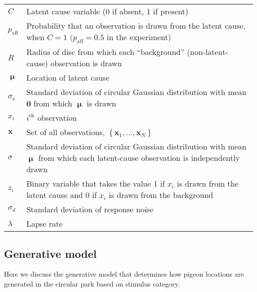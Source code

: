 \documentclass{article}
\newcommand{\mu}{\boldsymbol\upmu}
\newcommand{\sigs}{\sigma_\text{s}}
\newcommand{\xx}{\mathbf{x}}
\begin{document}
\noindent
\begin{tabular}{|l|p{4in}|}
\hline
$C$ & Latent cause variable (0 if absent, 1 if present)\\
$p_{\text{aff}}$ & Probability that an observation is drawn from the latent cause, when $C=1$ $(p_{\text{aff}}=0.5$ in the experiment)\\
$R$ & Radius of disc from which each ``background'' (non-latent-cause) observation is drawn\\
 $\mu$ & Location of latent cause\\
$\sigs$ & Standard deviation of circular Gaussian distribution with mean $\mathbf{0}$ from which $\mu$ is drawn\\
$x_i$ & $i^\text{th}$ observation\\
$\mathbf{x}$ & Set of all observations, $\left\{\xx_1, \dots, \xx_N\right\}$\\
$\sigma$ & Standard deviation of circular Gaussian distribution with mean  $\mu$ from which each latent-cause observation is  independently drawn\\
$z_i$ & Binary variable that takes the value 1 if $x_i$ is drawn from the latent cause and 0 if $x_i$ is drawn from the background\\
$\sigma_d$ & Standard deviation of response noise\\
$\lambda$ & Lapse rate\\
\hline
\end{tabular}



\subsection*{Generative model}
Here we discuss the generative model that determines how pigeon locations are generated in the circular park based on stimulus category.
\end{document}
